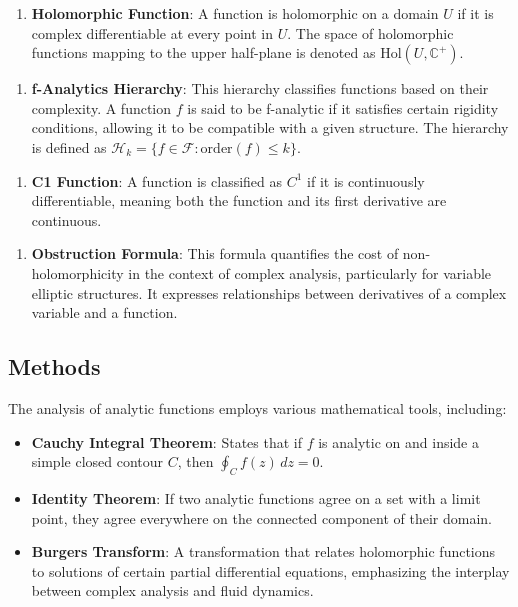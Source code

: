 \documentclass[11pt,a4paper]{article}
\begin{document}
\begin{enumerate}
\item \textbf{Holomorphic Function}: A function is holomorphic on a domain \( U \) if it is complex differentiable at every point in \( U \). The space of holomorphic functions mapping to the upper half-plane is denoted as \( \text{Hol}(U, \mathbb{C}^+) \).
\end{enumerate}

\begin{enumerate}
\item \textbf{f-Analytics Hierarchy}: This hierarchy classifies functions based on their complexity. A function \( f \) is said to be f-analytic if it satisfies certain rigidity conditions, allowing it to be compatible with a given structure. The hierarchy is defined as \( \mathcal{H}_k = \{ f \in \mathcal{F} : \text{order}(f) \leq k \} \).
\end{enumerate}

\begin{enumerate}
\item \textbf{C1 Function}: A function is classified as \( C^1 \) if it is continuously differentiable, meaning both the function and its first derivative are continuous.
\end{enumerate}

\begin{enumerate}
\item \textbf{Obstruction Formula}: This formula quantifies the cost of non-holomorphicity in the context of complex analysis, particularly for variable elliptic structures. It expresses relationships between derivatives of a complex variable and a function.
\end{enumerate}

\subsection{Methods}

The analysis of analytic functions employs various mathematical tools, including:

\begin{itemize}
\item \textbf{Cauchy Integral Theorem}: States that if \( f \) is analytic on and inside a simple closed contour \( C \), then \( \oint_C f(z) \, dz = 0 \).
\item \textbf{Identity Theorem}: If two analytic functions agree on a set with a limit point, they agree everywhere on the connected component of their domain.
\item \textbf{Burgers Transform}: A transformation that relates holomorphic functions to solutions of certain partial differential equations, emphasizing the interplay between complex analysis and fluid dynamics.
\end{itemize}
\end{document}
